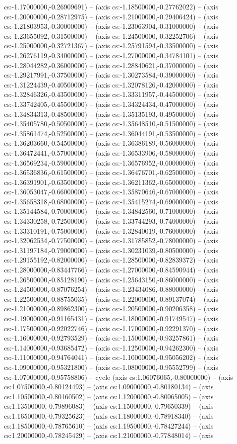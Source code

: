 cs:-1.17000000,-0.26909691) -- (axis cs:-1.18500000,-0.27762022) -- (axis cs:-1.20000000,-0.28712975) -- (axis cs:-1.21000000,-0.29406424) -- (axis cs:-1.21803953,-0.30000000) -- (axis cs:-1.23063904,-0.31000000) -- (axis cs:-1.23655092,-0.31500000) -- (axis cs:-1.24500000,-0.32252706) -- (axis cs:-1.25000000,-0.32721367) -- (axis cs:-1.25791594,-0.33500000) -- (axis cs:-1.26276119,-0.34000000) -- (axis cs:-1.27000000,-0.34784101) -- (axis cs:-1.28044282,-0.36000000) -- (axis cs:-1.28840621,-0.37000000) -- (axis cs:-1.29217991,-0.37500000) -- (axis cs:-1.30273584,-0.39000000) -- (axis cs:-1.31224439,-0.40500000) -- (axis cs:-1.32078126,-0.42000000) -- (axis cs:-1.32846326,-0.43500000) -- (axis cs:-1.33311957,-0.44500000) -- (axis cs:-1.33742405,-0.45500000) -- (axis cs:-1.34324434,-0.47000000) -- (axis cs:-1.34834313,-0.48500000) -- (axis cs:-1.35135193,-0.49500000) -- (axis cs:-1.35405780,-0.50500000) -- (axis cs:-1.35648510,-0.51500000) -- (axis cs:-1.35861474,-0.52500000) -- (axis cs:-1.36044191,-0.53500000) -- (axis cs:-1.36203660,-0.54500000) -- (axis cs:-1.36386189,-0.56000000) -- (axis cs:-1.36472441,-0.57000000) -- (axis cs:-1.36533906,-0.58000000) -- (axis cs:-1.36569234,-0.59000000) -- (axis cs:-1.36576952,-0.60000000) -- (axis cs:-1.36536836,-0.61500000) -- (axis cs:-1.36476701,-0.62500000) -- (axis cs:-1.36391901,-0.63500000) -- (axis cs:-1.36211362,-0.65000000) -- (axis cs:-1.36053047,-0.66000000) -- (axis cs:-1.35870646,-0.67000000) -- (axis cs:-1.35658318,-0.68000000) -- (axis cs:-1.35415274,-0.69000000) -- (axis cs:-1.35144584,-0.70000000) -- (axis cs:-1.34842560,-0.71000000) -- (axis cs:-1.34330258,-0.72500000) -- (axis cs:-1.33744293,-0.74000000) -- (axis cs:-1.33310191,-0.75000000) -- (axis cs:-1.32840019,-0.76000000) -- (axis cs:-1.32062534,-0.77500000) -- (axis cs:-1.31785852,-0.78000000) -- (axis cs:-1.31197184,-0.79000000) -- (axis cs:-1.30231039,-0.80500000) -- (axis cs:-1.29155192,-0.82000000) -- (axis cs:-1.28500000,-0.82839372) -- (axis cs:-1.28000000,-0.83447766) -- (axis cs:-1.27000000,-0.84590944) -- (axis cs:-1.26500000,-0.85128190) -- (axis cs:-1.25643150,-0.86000000) -- (axis cs:-1.24500000,-0.87076254) -- (axis cs:-1.23434086,-0.88000000) -- (axis cs:-1.22500000,-0.88755035) -- (axis cs:-1.22000000,-0.89137074) -- (axis cs:-1.21000000,-0.89862300) -- (axis cs:-1.20500000,-0.90206358) -- (axis cs:-1.19000000,-0.91165431) -- (axis cs:-1.18000000,-0.91749547) -- (axis cs:-1.17500000,-0.92022746) -- (axis cs:-1.17000000,-0.92291370) -- (axis cs:-1.16000000,-0.92793529) -- (axis cs:-1.15000000,-0.93257861) -- (axis cs:-1.14000000,-0.93685472) -- (axis cs:-1.12500000,-0.94262300) -- (axis cs:-1.11000000,-0.94764041) -- (axis cs:-1.10000000,-0.95056202) -- (axis cs:-1.09000000,-0.95321800) -- (axis cs:-1.08000000,-0.95552799) -- (axis cs:-1.07000000,-0.95758806) -- cycle (axis cs:1.06076065,-0.80000000) -- (axis cs:1.07500000,-0.80124493) -- (axis cs:1.09000000,-0.80180134) -- (axis cs:1.10500000,-0.80160502) -- (axis cs:1.12000000,-0.80065005) -- (axis cs:1.13500000,-0.79896083) -- (axis cs:1.15000000,-0.79650339) -- (axis cs:1.16500000,-0.79325623) -- (axis cs:1.18000000,-0.78918340) -- (axis cs:1.18500000,-0.78765610) -- (axis cs:1.19500000,-0.78427244) -- (axis cs:1.20000000,-0.78245429) -- (axis cs:1.21000000,-0.77848014) -- (axis 